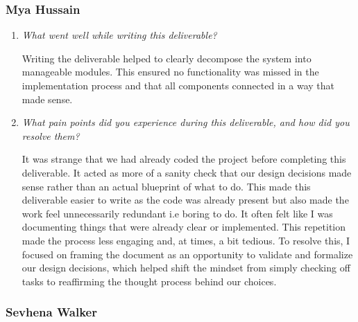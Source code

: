 \documentclass[12pt, titlepage]{article}
\begin{document}
\subsubsection*{Mya Hussain}

\begin{enumerate}
  \item \textit{What went well while writing this deliverable? }
  
  Writing the deliverable helped to clearly decompose the system into manageable modules.
  This ensured no functionality was missed in the implementation process and that all 
  components connected in a way that made sense. 

  \item \textit{What pain points did you experience during this deliverable, and how did you resolve them?}

  It was strange that we had already coded the project before completing this deliverable.
  It acted as more of a sanity check that our design decisions made sense rather than 
  an actual blueprint of what to do. This made this deliverable easier to write as 
  the code was already present but also made the work feel unnecessarily redundant i.e boring to do.
  It often felt like I was documenting things that were already clear or implemented. 
  This repetition made the process less engaging and, at times, a bit tedious.
  To resolve this, I focused on framing the document as an opportunity to validate 
  and formalize our design decisions, which helped shift the mindset from simply 
  checking off tasks to reaffirming the thought process behind our choices.
    
\end{enumerate}

\subsubsection*{Sevhena Walker}
\end{document}
